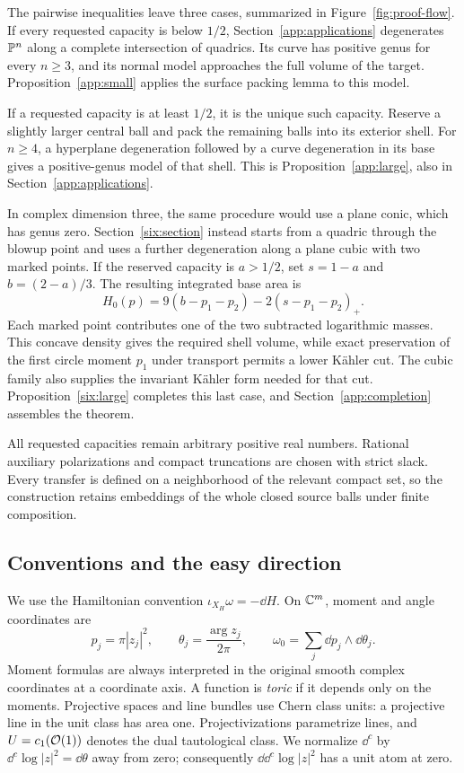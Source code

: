 The pairwise inequalities leave three cases, summarized in
Figure~\ref{fig:proof-flow}. If every requested capacity is below
\(1/2\), Section~\ref{app:applications} degenerates \(\mathbb P^n\)
along a complete intersection of quadrics. Its curve has positive genus
for every \(n\ge3\), and its normal model approaches the full volume
of the target. Proposition~\ref{app:small} applies the surface packing
lemma to this model.

If a requested capacity is at least \(1/2\), it is the unique such
capacity. Reserve a slightly larger central ball and pack the remaining
balls into its exterior shell. For \(n\ge4\), a hyperplane degeneration
followed by a curve degeneration in its base gives a positive-genus model
of that shell. This is Proposition~\ref{app:large}, also in
Section~\ref{app:applications}.

In complex dimension three, the same procedure would use a plane conic,
which has genus zero. Section~\ref{six:section} instead starts from a
quadric through the blowup point and uses a further degeneration along
a plane cubic with two marked points. If the reserved capacity is
\(a>1/2\), set \(s=1-a\) and \(b=(2-a)/3\). The resulting
integrated base area is
\[
 H_0(p)=9(b-p_1-p_2)-2(s-p_1-p_2)_+.
\]
Each marked point contributes one of the two subtracted logarithmic
masses. This concave density gives the required shell volume, while
exact preservation of the first circle moment \(p_1\) under transport
permits a lower
K\"ahler cut. The cubic family also supplies the invariant K\"ahler
form needed for that cut. Proposition~\ref{six:large} completes this
last case, and Section~\ref{app:completion} assembles the theorem.

All requested capacities remain arbitrary positive real numbers.
Rational auxiliary polarizations and compact truncations are chosen
with strict slack. Every transfer is defined on a neighborhood of the
relevant compact set, so the construction retains embeddings of the
whole closed source balls under finite composition.



\subsection{Conventions and the easy direction}

We use the Hamiltonian convention
\(\iota_{X_H}\omega=-\dd H\). On \(\mathbb C^m\), moment and angle coordinates
are
\[
 p_j=\pi|z_j|^2,\qquad
 \theta_j=\frac{\arg z_j}{2\pi},\qquad
 \omega_0=\sum_j\dd p_j\wedge\dd\theta_j.
\]
Moment formulas are always interpreted in the original smooth complex
coordinates at a coordinate axis. A function is \emph{toric} if it
depends only on the moments. Projective spaces and line bundles use
Chern class units: a projective line in the unit class has area one.
Projectivizations parametrize lines, and \(U=c_1(\mathcal O(1))\) denotes the
dual tautological class. We normalize \(\dd^c\) by
\(\dd^c\log|z|^2=\dd\theta\) away from zero; consequently
\(\dd\dd^c\log|z|^2\) has a unit atom at zero.

